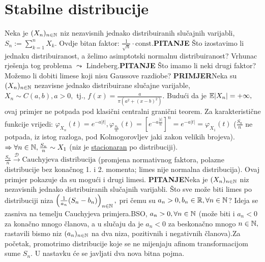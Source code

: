 \documentclass{article}
\begin{document}
\section{Stabilne distribucije}
Neka je \((X_n)_{n\in\Bbb N}\) niz nezavisnih jednako distribuiranih slučajnih varijabli, \(S_n:=\sum_{k=1}^nX_k.\) Ovdje bitan faktor: \(\frac1{\sqrt n}\cdot\text{const.}\)\newline\textbf{PITANJE} Što izostavimo li jednaku distribuiranost, a želimo asimptotski normalnu distribuiranost? Vrhunac rješenja tog problema \(\leadsto\) Lindeberg.\newline\textbf{PITANJE} Što imamo li neki drugi faktor? Možemo li dobiti limese koji nisu Gaussove razdiobe?\newline\newline
\textbf{PRIMJER}\newline Neka su \((X_n)_{n\in\Bbb N}\) nezavisne jednako distribuirane slučajne varijable, \(X_n\sim C(a,b),a>0,\) tj., \(f(x)=\frac{a}{\pi(a^2+(x-b)^2)}.\) Budući da je \(\Bbb E|X_n|=+\infty,\) ovaj primjer ne potpada pod klasični centralni granični teorem. Za karakteristične funkcije vrijedi: \(\varphi_{X_n}(t)=e^{-a|t|},\varphi_{\frac{S_n}n}(t)=\left[e^{-a\frac{|t|}n}\right]^n=e^{-a|t|}=\varphi_{X_1}(t)\) (\(\frac{S_n}n\) ne potpada, iz istog razloga, pod Kolmogorovljev jaki zakon velikih brojeva). \(\Rightarrow\forall n\in\Bbb N,\frac{S_n}n\sim X_1\) (niz je \underline{stacionaran} po distribuciji). \(\frac{S_n}n\overset{\mathcal D}{\longrightarrow}\text{Cauchyjeva distribucija}\) (promjena normativnog faktora, polazne distribucije bez konačnog 1. i 2. momenta; limes nije normalna distribucija). Ovaj primjer pokazuje da su mogući i drugi limesi.\newline\newline
\textbf{PITANJE}\newline Neka je \((X_n)_{n\in\Bbb N}\) niz nezavisnih jednako distribuiranih slučajnih varijabli. Što sve može biti limes po distribuciji niza \(\left(\frac1{a_n}(S_n-b_n)\right)_{n\in\Bbb N},\) pri čemu su \(a_n>0,b_n\in\Bbb R,\forall n\in\Bbb N\)? Ideja se zasniva na temelju Cauchyjeva primjera.\newline BSO, \(a_n>0,\forall n\in\Bbb N\) (može biti i \(a_n<0\) za konačno mnogo članova, a u slučaju da je \(a_n<0\) za beskonačno mnogo \(n\in\Bbb N,\) rastavili bismo niz \((a_n)_{n\in\Bbb N}\) na dva niza, pozitivnih i negativnih članova).\newline Za početak, promotrimo distribucije koje se ne mijenjaju afinom transformacijom sume \(S_n.\) U nastavku će se javljati dva nova bitna pojma.\newline\newline
\end{document}
